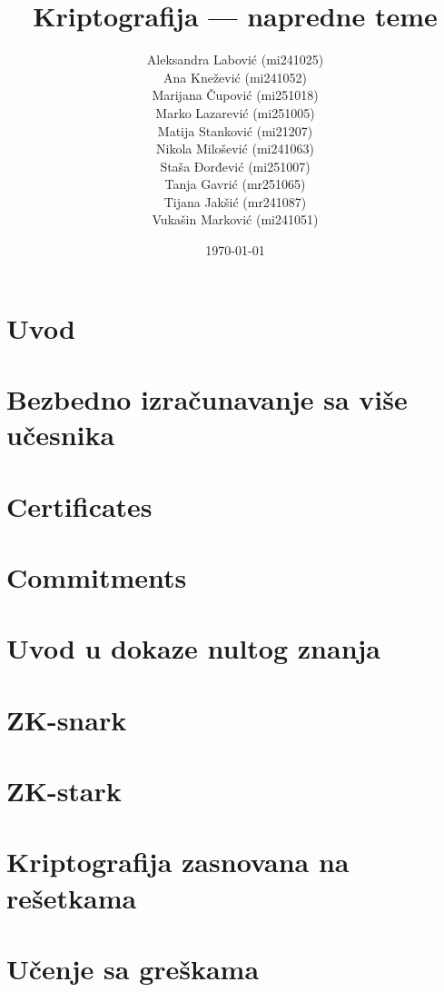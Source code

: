 \documentclass[12pt,a4paper]{report}
\title{\Huge Kriptografija --- napredne teme}
\author{Aleksandra Labović (mi241025)\\
Ana Knežević (mi241052)\\
Marijana Čupović (mi251018)\\
Marko Lazarević (mi251005)\\
Matija Stanković (mi21207)\\
Nikola Milošević (mi241063)\\
Staša Đorđević (mi251007)\\
Tanja Gavrić (mr251065)\\
Tijana Jakšić (mr241087)\\
Vukašin Marković (mi241051)}
\date{\today}
\begin{document}
\maketitle
{}
\pagestyle{empty}
\tableofcontents
\thispagestyle{empty}
\clearpage
{}
\pagestyle{fancy}

\chapter{Uvod}


\chapter{Bezbedno izračunavanje sa više učesnika}


\chapter{Certificates}


\chapter{Commitments}


\chapter{Uvod u dokaze nultog znanja}


\chapter{ZK-snark}


\chapter{ZK-stark}


\chapter{Kriptografija zasnovana na rešetkama}


\chapter{Učenje sa greškama}

\end{document}
